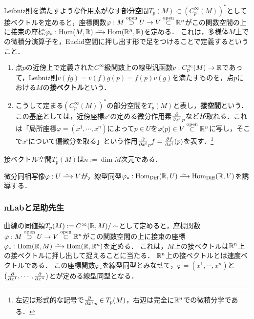 \documentclass[uplatex,dvipdfmx]{jsreport}
\begin{document}
\begin{tcolorbox}[colframe=ForestGreen, colback=ForestGreen!10!white,breakable,colbacktitle=ForestGreen!40!white,coltitle=black,fonttitle=\bfseries\sffamily,
title=解析的定義]
    Leibniz則を満たすような作用素がなす部分空間$T_p(M)\subset(C^\infty_p(M))^*$として接ベクトルを定めると，座標関数$\varphi:M\overset{\mathrm{open}}{\supset} U\to V\overset{\mathrm{open}}{\subset}\mathbb{R}^n$がこの関数空間の上に接束の座標$\varphi_*:\Hom(M,\R)\iso\Hom(\R^n,\R)$を定める．
    これは，多様体$M$上での微積分演算子を，Euclid空間に押し出す形で足をつけることで定義するということ．
\end{tcolorbox}

\begin{definition}\mbox{}
    \begin{enumerate}
        \item 点$p$の近傍上で定義された$C^\infty$級関数上の線型汎函数$v:C^\infty_p(M)\to\mathbb{R}$であって，Leibniz則$v(fg)=v(f)g(p)=f(p)v(g)$を満たすものを，点$p$における$M$の\textbf{接ベクトル}という．
        \item こうして定まる$(C^\infty_p(M))^*$の部分空間を$T_p(M)$と表し，\textbf{接空間}という．
        この基底としては，近傍座標$x^i$の定める微分作用素$\frac{\partial }{\partial x^i}_p$などが取れる．これは「局所座標$\varphi=(x^1,\cdots,x^n)$によって$p\in U$を$\varphi(p)\in V\overset{\mathrm{open}}{\subset}\mathbb{R}^n$に写し，そこで$x^i$について偏微分を取る」という作用$\frac{\partial }{\partial x^i}_pf=\frac{\partial f}{\partial x^i}(p)$を表す．\footnote{左辺は形式的な記号で$\frac{\partial }{\partial x^i}_p\in T_p(M)$，右辺は完全に$\mathbb{R}^n$での微積分学である．}
    \end{enumerate}
\end{definition}

\begin{theorem}[接空間の次元]\label{thm-dimention-of-tangent-space}
    接ベクトル空間$T_p(M)$は$n:=\dim M$次元である．
\end{theorem}
\begin{remarks}
    微分同相写像$\varphi:U\iso V$が，線型同型$\varphi_*:\Hom_\Diff(\R,U)\iso\Hom_\Diff(\R,V)$を誘導する．
\end{remarks}

\subsubsection{nLabと足助先生}

\begin{tcolorbox}[colframe=ForestGreen, colback=ForestGreen!10!white,breakable,colbacktitle=ForestGreen!40!white,coltitle=black,fonttitle=\bfseries\sffamily,
title=幾何学的定義]
    曲線の同値類$T_p(M):=C^\infty(\mathbb{R},M)/\sim$として定めると，座標関数$\varphi:M\overset{\mathrm{open}}{\supset} U\to V\overset{\mathrm{open}}{\subset}\mathbb{R}^n$がこの関数空間の上に接束の座標$\varphi_*:\Hom(\R,M)\iso\Hom(\R,\R^n)$を定める．
    これは，$M$上の接ベクトルは$\mathbb{R}^n$上の接ベクトルに押し出して捉えることに当たる．
    $\mathbb{R}^n$上の接ベクトルとは速度ベクトルである．
    この座標関数$\varphi_*$を線型同型とみなせて，$\varphi=(x^1,\cdots,x^n)$と$\left(\frac{\partial }{\partial x^1},\cdots,\frac{\partial }{\partial x^n}\right)$とが定める線型同型となる．
\end{tcolorbox}
\end{document}
